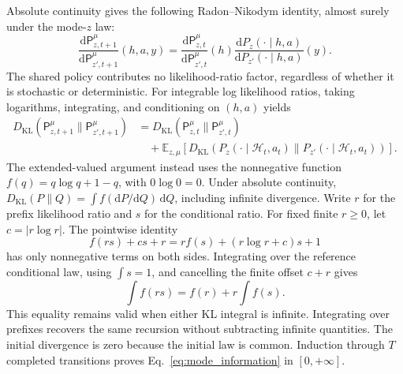 Absolute continuity gives the following Radon--Nikodym identity, almost surely under the mode-$z$ law:
\begin{equation}
 \frac{\mathrm d\mathsf P_{z,t+1}^{\mu}}
      {\mathrm d\mathsf P_{z',t+1}^{\mu}}(h,a,y)
 =\frac{\mathrm d\mathsf P_{z,t}^{\mu}}
       {\mathrm d\mathsf P_{z',t}^{\mu}}(h)
   \frac{\mathrm dP_z(\cdot\mid h,a)}
        {\mathrm dP_{z'}(\cdot\mid h,a)}(y).
\end{equation}
The shared policy contributes no likelihood-ratio factor, regardless of whether it is stochastic or deterministic. For integrable log likelihood ratios, taking logarithms, integrating, and conditioning on $(h,a)$ yields
\begin{align}
 D_{\mathrm{KL}}(\mathsf P_{z,t+1}^{\mu}\|\mathsf P_{z',t+1}^{\mu})
 &=D_{\mathrm{KL}}(\mathsf P_{z,t}^{\mu}\|\mathsf P_{z',t}^{\mu})\nonumber\\
 &\quad+\mathbb E_{z,\mu}\!\left[
 D_{\mathrm{KL}}\!\left(P_z(\cdot\mid\mathcal H_t,a_t)\|
 P_{z'}(\cdot\mid\mathcal H_t,a_t)\right)\right].
\end{align}
The extended-valued argument instead uses the nonnegative function $f(q)=q\log q+1-q$, with $0\log0=0$. Under absolute continuity, $D_{\mathrm{KL}}(P\|Q)=\int f(\mathrm dP/\mathrm dQ)\,\mathrm dQ$, including infinite divergence. Write $r$ for the prefix likelihood ratio and $s$ for the conditional ratio. For fixed finite $r\ge0$, let $c=|r\log r|$. The pointwise identity
\begin{equation}
 f(rs)+cs+r=rf(s)+(r\log r+c)s+1
\end{equation}
has only nonnegative terms on both sides. Integrating over the reference conditional law, using $\int s=1$, and cancelling the finite offset $c+r$ gives
\begin{equation}
 \int f(rs)=f(r)+r\int f(s).
\end{equation}
This equality remains valid when either KL integral is infinite. Integrating over prefixes recovers the same recursion without subtracting infinite quantities. The initial divergence is zero because the initial law is common. Induction through $T$ completed transitions proves Eq.~\eqref{eq:mode_information} in $[0,+\infty]$.

